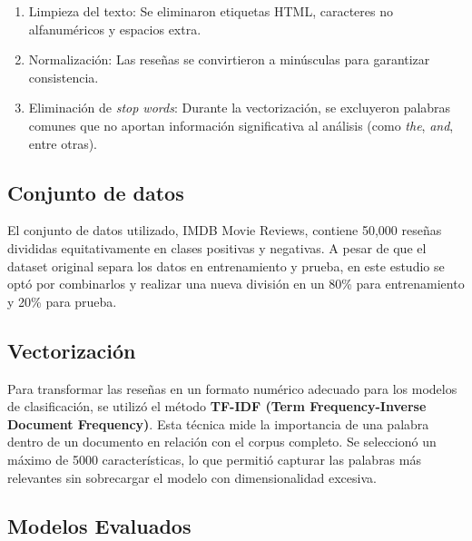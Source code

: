 \documentclass[conference]{IEEEtran}
\begin{document}
\begin{enumerate}
    \item Limpieza del texto: Se eliminaron etiquetas HTML, caracteres no alfanuméricos y espacios extra.
    
    \item Normalización: Las reseñas se convirtieron a minúsculas para garantizar consistencia.
    
    \item Eliminación de \textit{stop words}: Durante la vectorización, se excluyeron palabras comunes que no aportan información significativa al análisis (como \textit{the}, \textit{and}, entre otras).
\end{enumerate}


\subsection{Conjunto de datos}

El conjunto de datos utilizado, IMDB Movie Reviews, contiene 50,000 reseñas divididas equitativamente en clases positivas y negativas. A pesar de que el dataset original separa los datos en entrenamiento y prueba, en este estudio se optó por combinarlos y realizar una nueva división en un 80\% para entrenamiento y 20\% para prueba.


\subsection{Vectorización}

Para transformar las reseñas en un formato numérico adecuado para los modelos de clasificación, se utilizó el método \textbf{TF-IDF (Term Frequency-Inverse Document Frequency)}. Esta técnica mide la importancia de una palabra dentro de un documento en relación con el corpus completo. Se seleccionó un máximo de 5000 características, lo que permitió capturar las palabras más relevantes sin sobrecargar el modelo con dimensionalidad excesiva.


\subsection{Modelos Evaluados}
\end{document}
